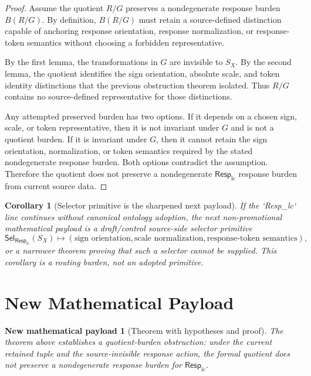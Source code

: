 \documentclass[11pt]{article}
\newcommand{\RespLC}{\mathsf{Resp}_{\mathrm{lc}}}
\newcommand{\SelResp}{\mathsf{Sel}_{\RespLC}}
\newtheorem{corollary}{Corollary}
\newtheorem{payload}{New mathematical payload}
\begin{document}
\begin{proof}
Assume the quotient \(R/G\) preserves a nondegenerate response burden
\(B(R/G)\). By definition, \(B(R/G)\) must retain a source-defined
distinction capable of anchoring response orientation, response
normalization, or response-token semantics without choosing a
forbidden representative.

By the first lemma, the transformations in \(G\) are invisible to
\(S_X\). By the second lemma, the quotient identifies the sign
orientation, absolute scale, and token identity distinctions that the
previous obstruction theorem isolated. Thus \(R/G\) contains no
source-defined representative for those distinctions.

Any attempted preserved burden has two options. If it depends on a
chosen sign, scale, or token representative, then it is not invariant
under \(G\) and is not a quotient burden. If it is invariant under
\(G\), then it cannot retain the sign orientation, normalization, or
token semantics required by the stated nondegenerate response burden.
Both options contradict the assumption. Therefore the quotient does
not preserve a nondegenerate \(\RespLC\) response burden from current
source data.
\end{proof}

\begin{corollary}[Selector primitive is the sharpened next payload]
If the `Resp_lc` line continues without canonical ontology adoption,
the next non-promotional mathematical payload is a draft/control
source-side selector primitive
\[
    \SelResp(S_X)\mapsto
    (\text{sign orientation},\text{scale normalization},
    \text{response-token semantics}),
\]
or a narrower theorem proving that such a selector cannot be supplied.
This corollary is a routing burden, not an adopted primitive.
\end{corollary}

\section{New Mathematical Payload}

\begin{payload}[Theorem with hypotheses and proof]
The theorem above establishes a quotient-burden obstruction: under the
current retained tuple and the source-invisible response action, the
formal quotient does not preserve a nondegenerate response burden for
\(\RespLC\).
\end{payload}
\end{document}
